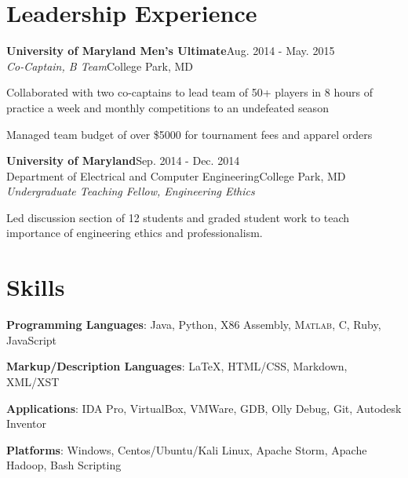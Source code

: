 \documentclass[letterpaper,12pt]{article}
\def \myrespresectionskip {-.25in}
\def \resumeitemizeskip{0in}
\def \jobskip{.075in}
\newcommand{\resheading}[5]{
\normalsize{\textbf{#1}}\hfill{\rmfamily\normalsize\textcolor{faded}{#2}} \\
\normalsize{#3}\hfill{\textcolor{faded}{\normalsize#4}}\\
\normalsize{#5}
\normalsize
}
\newcommand{\resitem}[1]{\item #1 \vspace{-2pt}}
\begin{document}
\section*{Leadership Experience}
\resheading{{University of Maryland Men's Ultimate}}{Aug. 2014 \-- May. 2015}{\emph{Co-Captain, B Team}}{College Park, MD}{}
   { \footnotesize
\vspace{-.2in}
      \begin{resumeitemize}
	\item{Collaborated with two co-captains to lead team of 50+ players in 8 hours of practice a week and monthly competitions to an undefeated season}
	\item{Managed team budget of over \$5000 for tournament fees and apparel orders}
          \end{resumeitemize}
}
\vspace{\jobskip}
\resheading{{University of Maryland}}{Sep. 2014 \-- Dec. 2014}{{Department of Electrical and Computer Engineering}}{College Park, MD}{\emph{Undergraduate Teaching Fellow, Engineering Ethics}}
   { \footnotesize
\vspace{\resumeitemizeskip}
      \begin{resumeitemize}
	\item{Led discussion section of 12 students and graded student work to teach importance of engineering ethics and professionalism.}
          \end{resumeitemize}
}
\vspace{\myrespresectionskip}
\section*{Skills}
\begin{skillsitemize}
\resitem{\textbf{Programming Languages}: Java, Python, X86 Assembly, \textsc{Matlab}, C,  Ruby, JavaScript}
\resitem{\textbf{Markup/Description Languages}: \LaTeX, HTML/CSS, Markdown, XML/XST}
\resitem{\textbf{Applications}: IDA Pro, VirtualBox, VMWare, GDB, Olly Debug, Git, Autodesk Inventor}
\resitem{\textbf{Platforms}: Windows, Centos/Ubuntu/Kali Linux, Apache Storm, Apache Hadoop, Bash Scripting}
\end{skillsitemize}
\end{document}
